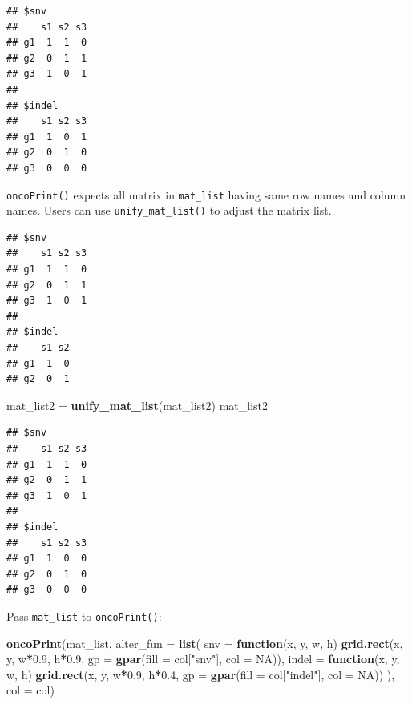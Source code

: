 \documentclass[]{book}
\newenvironment{Shaded}{\begin{snugshade}}{\end{snugshade}}
\newcommand{\KeywordTok}[1]{\textcolor[rgb]{0.13,0.29,0.53}{\textbf{#1}}}
\newcommand{\DataTypeTok}[1]{\textcolor[rgb]{0.13,0.29,0.53}{#1}}
\newcommand{\DecValTok}[1]{\textcolor[rgb]{0.00,0.00,0.81}{#1}}
\newcommand{\FloatTok}[1]{\textcolor[rgb]{0.00,0.00,0.81}{#1}}
\newcommand{\StringTok}[1]{\textcolor[rgb]{0.31,0.60,0.02}{#1}}
\newcommand{\OtherTok}[1]{\textcolor[rgb]{0.56,0.35,0.01}{#1}}
\newcommand{\ControlFlowTok}[1]{\textcolor[rgb]{0.13,0.29,0.53}{\textbf{#1}}}
\newcommand{\OperatorTok}[1]{\textcolor[rgb]{0.81,0.36,0.00}{\textbf{#1}}}
\newcommand{\NormalTok}[1]{#1}
\theoremstyle{definition}
\theoremstyle{definition}
\theoremstyle{definition}
\theoremstyle{remark}
\begin{document}
\begin{verbatim}
## $snv
##    s1 s2 s3
## g1  1  1  0
## g2  0  1  1
## g3  1  0  1
## 
## $indel
##    s1 s2 s3
## g1  1  0  1
## g2  0  1  0
## g3  0  0  0
\end{verbatim}

\texttt{oncoPrint()} expects all matrix in \texttt{mat\_list} having
same row names and column names. Users can use
\texttt{unify\_mat\_list()} to adjust the matrix list.

\begin{Shaded}
\end{Shaded}

\begin{verbatim}
## $snv
##    s1 s2 s3
## g1  1  1  0
## g2  0  1  1
## g3  1  0  1
## 
## $indel
##    s1 s2
## g1  1  0
## g2  0  1
\end{verbatim}

\begin{Shaded}
\begin{Highlighting}[]
\NormalTok{mat_list2 =}\StringTok{ }\KeywordTok{unify_mat_list}\NormalTok{(mat_list2)}
\NormalTok{mat_list2}
\end{Highlighting}
\end{Shaded}

\begin{verbatim}
## $snv
##    s1 s2 s3
## g1  1  1  0
## g2  0  1  1
## g3  1  0  1
## 
## $indel
##    s1 s2 s3
## g1  1  0  0
## g2  0  1  0
## g3  0  0  0
\end{verbatim}

Pass \texttt{mat\_list} to \texttt{oncoPrint()}:

\begin{Shaded}
\begin{Highlighting}[]
\KeywordTok{oncoPrint}\NormalTok{(mat_list,}
    \DataTypeTok{alter_fun =} \KeywordTok{list}\NormalTok{(}
        \DataTypeTok{snv =} \ControlFlowTok{function}\NormalTok{(x, y, w, h) }\KeywordTok{grid.rect}\NormalTok{(x, y, w}\OperatorTok{*}\FloatTok{0.9}\NormalTok{, h}\OperatorTok{*}\FloatTok{0.9}\NormalTok{, }\DataTypeTok{gp =} \KeywordTok{gpar}\NormalTok{(}\DataTypeTok{fill =}\NormalTok{ col[}\StringTok{"snv"}\NormalTok{], }\DataTypeTok{col =} \OtherTok{NA}\NormalTok{)),}
        \DataTypeTok{indel =} \ControlFlowTok{function}\NormalTok{(x, y, w, h) }\KeywordTok{grid.rect}\NormalTok{(x, y, w}\OperatorTok{*}\FloatTok{0.9}\NormalTok{, h}\OperatorTok{*}\FloatTok{0.4}\NormalTok{, }\DataTypeTok{gp =} \KeywordTok{gpar}\NormalTok{(}\DataTypeTok{fill =}\NormalTok{ col[}\StringTok{"indel"}\NormalTok{], }\DataTypeTok{col =} \OtherTok{NA}\NormalTok{))}
\NormalTok{    ), }\DataTypeTok{col =}\NormalTok{ col)}
\end{Highlighting}
\end{Shaded}
\end{document}
